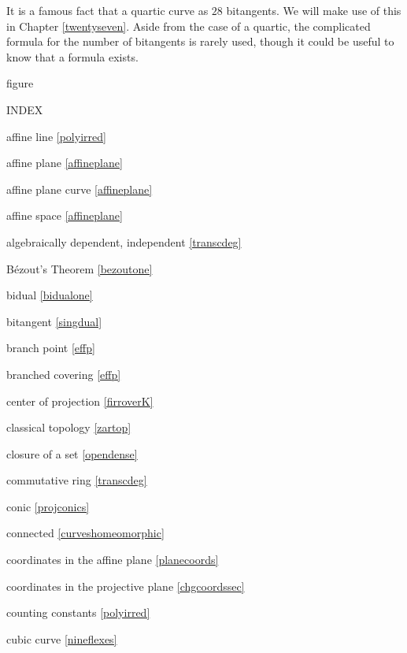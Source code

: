 \documentclass[leqno]{book}
\theoremstyle{definition}%
\numberwithin{equation}{section}
\theoremstyle{theorem} %
\begin{document}
\newpage
\msno 
It is a famous fact that a quartic  curve as $28$
bitangents.  We will make use of this  in Chapter \ref{twentyseven}.
Aside from the case of a quartic, the complicated formula for the
number of bitangents is rarely used, though it could be useful to know
that a formula exists.


\bs
\centerline{figure}

%


\newpage

\no
INDEX

\ms

\no
affine line  \ref{polyirred}

\no
affine plane \ref{affineplane}

\no
affine plane curve \ref{affineplane}

\no
affine space \ref{affineplane}

\no
algebraically dependent, independent  \ref{transcdeg}

\no
B\'ezout's Theorem \ref{bezoutone}

\no
bidual \ref{bidualone}

\no
bitangent \ref{singdual}

\no
branch point \ref{effp}

\no
branched covering \ref{effp}

\no
center of projection \ref{firroverK}

\no
classical topology \ref{zartop}

\no
closure of a set  \ref{opendense}

\no
commutative ring \ref{transcdeg}

\no
conic \ref{projconics}

\no
connected \ref{curveshomeomorphic}

\no
coordinates in the affine plane \ref{planecoords}

\no
coordinates in the projective plane \ref{chgcoordssec}

\no
counting constants  \ref{polyirred}

\no
cubic curve \ref{nineflexes}
\end{document}
